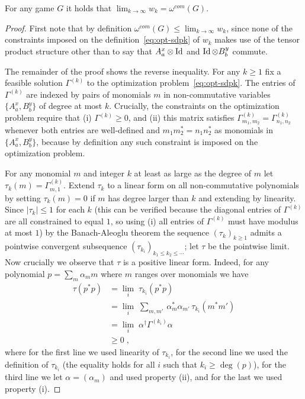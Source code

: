\begin{lemma}
For any game $G$ it holds that $\lim_{k\to\infty} w_k = \omega^{com}(G)$.
\end{lemma}

\begin{proof}
First note that by definition $\omega^{com}(G)\leq \lim_{k\to\infty} w_k$, since none of the constraints imposed on the definition~\eqref{eq:opt-sdpk} of $w_k$ makes use of the tensor product structure other than to say that $A^x_a \otimes \mathop{\rm Id}\nolimits$ and $\mathop{\rm Id}\nolimits\otimes B^y_b$ commute. 

The remainder of the proof shows the reverse inequality. For any $k\geq 1$ fix a feasible solution $\Gamma^{(k)}$ to the optimization problem~\eqref{eq:opt-sdpk}. The entries of $\Gamma^{(k)}$ are indexed by pairs of monomials $m$ in non-commutative variables $\{A^x_a,B^y_b\}$ of degree at most $k$. 
Crucially, the constraints on the optimization problem require that (i) $\Gamma^{(k)} \geq 0$, and (ii) this matrix satisfies $\Gamma^{(k)}_{m_1,m_2}=\Gamma^{(k)}_{n_1,n_2}$ whenever both entries are well-defined and $m_1 m_2^* = n_1 n_2^*$ as monomials in $\{A^x_a,B^y_b\}$, because by definition any such constraint is imposed on the optimization problem. 

For any monomial $m$ and integer $k$ at least as large as the degree of $m$ let $\tau_k(m) = \Gamma^{(k)}_{m,1}$. 
Extend $\tau_k$ to a linear form on all non-commutative polynomials by setting $\tau_k(m)=0$ if $m$ has degree larger than $k$ and extending by linearity. Since $|\tau_k|\leq 1$ for each $k$ (this can be verified because the diagonal entries of $\Gamma^{(k)}$ are all constrained to equal $1$, so using (i) all entries of $\Gamma^{(k)}$ must have modulus at most $1$) by the Banach-Aleoglu theorem the sequence $(\tau_k)_{k\geq 1}$ admits a pointwise convergent subsequence $(\tau_{k_i})_{k_1\leq k_2\leq\cdots}$; let $\tau$ be the pointwise limit. Now crucially we observe that $\tau$ is a positive linear form. Indeed, for any polynomial $p = \sum_m \alpha_m m$ where $m$ ranges over monomials we have 
\begin{align*}
 \tau(p^*p) &= \lim_i \;\tau_{k_i}(p^*p) \\
&=  \lim_i \;\sum_{m,m'} \,\alpha_m^* \alpha_{m'} \,\tau_{k_i}(m^*m') \\
&= \lim_i \;\alpha^\dagger \Gamma^{(k_i)} \alpha\\
& \geq 0\;,
\end{align*}
where for the first line we used linearity of $\tau_{k_i}$, for the second line we used the definition of $\tau_{k_i}$ (the equality holds for all $i$ such that $k_i \geq \deg(p)$), for the third line we let $\alpha = (\alpha_m)$ and used property (ii), and for the last we used property (i). 


\end{proof}
